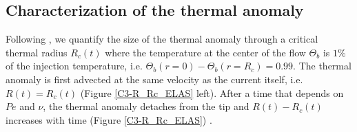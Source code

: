 \subsection{Characterization of the thermal anomaly}
\label{C3-sec:char-therm-anom-e}

Following \citet{Garel:2012bh},  we quantify  the size of  the thermal
anomaly  through   a  critical  thermal  radius   $R_c(t)$  where  the
temperature  at the  center of  the flow  $\Theta_b$ is  $1\%$ of  the
injection temperature,  i.e.  $\Theta_b(r=0)-\Theta_b(r=R_c)  = 0.99$.
The thermal  anomaly is  first advected  at the  same velocity  as the
current  itself,  i.e.   $R(t) =  R_c(t)$  (Figure  \ref{C3-R_Rc_ELAS}
left).   After a  time that  depends on  $Pe$ and  $\nu$, the  thermal
anomaly detaches  from the tip  and $R(t)-R_c(t)$ increases  with time
(Figure \ref{C3-R_Rc_ELAS}) .

